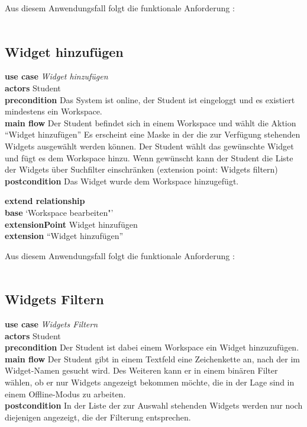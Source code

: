 Aus diesem Anwendungsfall folgt die funktionale Anforderung :\\
\requirement{\requirementWorkspaceDelete}\label{requirementWorkspaceDelete}\\

\subsection{Widget hinzufügen}
\textbf{use case} \emph{Widget hinzufügen}\\
\textbf{actors} Student\\
\textbf{precondition} Das System ist online, der Student ist eingeloggt und es existiert mindestens ein Workspace.\\
\textbf{main flow} Der Student befindet sich in einem Workspace und wählt die Aktion "`Widget hinzufügen"' Es erscheint eine Maske in der die zur Verfügung stehenden Widgets ausgewählt werden können. Der Student wählt das gewünschte Widget und fügt es dem Workspace hinzu. Wenn gewünscht kann der Student die Liste der Widgets über Suchfilter einschränken (extension point: Widgets filtern)\\
\textbf{postcondition} Das Widget wurde dem Workspace hinzugefügt.

\textbf{extend relationship}\\
\textbf{base} `Workspace bearbeiten"'\\
\textbf{extensionPoint} Widget hinzufügen\\
\textbf{extension} "`Widget hinzufügen"'

Aus diesem Anwendungsfall folgt die funktionale Anforderung :\\
\requirement{\requirementWidgetAdd}\label{requirementWidgetAdd}\\

\subsection{Widgets Filtern}
\textbf{use case} \emph{Widgets Filtern}\\
\textbf{actors} Student\\
\textbf{precondition} Der Student ist dabei einem Workspace ein Widget hinzuzufügen.\\
\textbf{main flow} Der Student gibt in einem Textfeld eine Zeichenkette an, nach der im Widget-Namen gesucht wird. Des Weiteren kann er in einem binären Filter wählen, ob er nur Widgets angezeigt bekommen möchte, die in der Lage sind in einem Offline-Modus zu arbeiten.\\
\textbf{postcondition} In der Liste der zur Auswahl stehenden Widgets werden nur noch diejenigen angezeigt, die der Filterung entsprechen.
 
